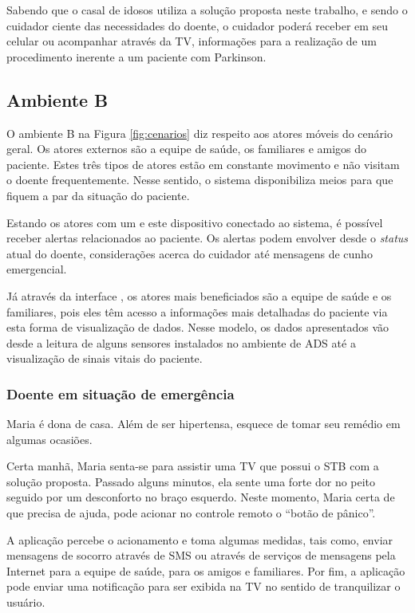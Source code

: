 Sabendo que o casal de idosos utiliza a solução proposta neste trabalho, e
sendo o cuidador ciente das necessidades do doente, o cuidador poderá receber
em seu celular ou acompanhar através da TV, informações para a realização de um
procedimento inerente a um paciente com Parkinson.

\subsection{Ambiente B} \label{subsec:ambiente-b}

O ambiente B na Figura \ref{fig:cenarios} diz respeito aos atores móveis do
cenário geral. Os atores externos são a equipe de saúde, os familiares e amigos
do paciente. Estes três tipos de atores estão em constante movimento e não
visitam o doente frequentemente. Nesse sentido, o sistema disponibiliza meios
para que fiquem a par da situação do paciente.

Estando os atores com um \smartphone[] e este dispositivo conectado ao
sistema, é possível receber alertas relacionados ao paciente. Os alertas podem
envolver desde o \textit{status} atual do doente, considerações acerca do
cuidador até mensagens de cunho emergencial.

Já através da interface \web[], os atores mais beneficiados são a equipe de
saúde e os familiares, pois eles têm acesso a informações mais detalhadas do
paciente via esta forma de visualização de dados. Nesse modelo, os dados
apresentados vão desde a leitura de alguns sensores instalados no ambiente de ADS
até a visualização de sinais vitais do paciente.

\subsubsection{Doente em situação de emergência}

Maria é dona de casa. Além de ser hipertensa, esquece de tomar seu remédio em 
algumas ocasiões.

Certa manhã, Maria senta-se para assistir uma TV que possui o STB com a solução
proposta. Passado alguns minutos, ela sente uma forte dor no peito seguido por
um desconforto no braço esquerdo. Neste momento, Maria certa de que precisa de
ajuda, pode acionar no controle remoto o ``botão de pânico''. 

A aplicação percebe o acionamento e toma algumas medidas, tais como, enviar
mensagens de socorro através de SMS ou através de serviços de mensagens pela
Internet para a equipe de saúde, para os amigos e familiares.  Por fim, a
aplicação pode enviar uma notificação para ser exibida na TV no sentido
de tranquilizar o usuário.

